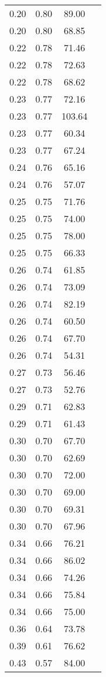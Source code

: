 \begin{longtable}[H]{ c c c c }
	 0.20 & 0.80 & 89.00 & \cite{Friak2012}\\
	 0.20 & 0.80 & 68.85 & \cite{Karre2015}\\
	 0.22 & 0.78 & 71.46 & \cite{Ozaki2004}\\
	 0.22 & 0.78 & 72.63 & \cite{Karre2015}\\
	 0.22 & 0.78 & 68.62 & \cite{Karre2015}\\
	 0.23 & 0.77 & 72.16 & \cite{Timoshevskii2011}\\
	 0.23 & 0.77 & 103.64 & \cite{Ozaki2004}\\
	 0.23 & 0.77 & 60.34 & \cite{Karre2015}\\
	 0.23 & 0.77 & 67.24 & \cite{Karre2015}\\
	 0.24 & 0.76 & 65.16 & \cite{Karre2015}\\
	 0.24 & 0.76 & 57.07 & \cite{Karre2015}\\
	 0.25 & 0.75 & 71.76 & \cite{Timoshevskii2011}\\
	 0.25 & 0.75 & 74.00 & \cite{Friak2012}\\
	 0.25 & 0.75 & 78.00 & \cite{Friak2012}\\
	 0.25 & 0.75 & 66.33 & \cite{Ozaki2004}\\
	 0.26 & 0.74 & 61.85 & \cite{Karre2015}\\
	 0.26 & 0.74 & 73.09 & \cite{Karre2015}\\
	 0.26 & 0.74 & 82.19 & \cite{Ozaki2004}\\
	 0.26 & 0.74 & 60.50 & \cite{Ozaki2004}\\
	 0.26 & 0.74 & 67.70 & \cite{Timoshevskii2011}\\
	 0.26 & 0.74 & 54.31 & \cite{Karre2015}\\
	 0.27 & 0.73 & 56.46 & \cite{Karre2015}\\
	 0.27 & 0.73 & 52.76 & \cite{Karre2015}\\
	 0.29 & 0.71 & 62.83 & \cite{Ozaki2004}\\
	 0.29 & 0.71 & 61.43 & \cite{Ozaki2004}\\
	 0.30 & 0.70 & 67.70 & \cite{Timoshevskii2011}\\
	 0.30 & 0.70 & 62.69 & \cite{Karre2015}\\
	 0.30 & 0.70 & 72.00 & \cite{Friak2012}\\
	 0.30 & 0.70 & 69.00 & \cite{Friak2012}\\
	 0.30 & 0.70 & 69.31 & \cite{Karre2015}\\
	 0.30 & 0.70 & 67.96 & \cite{Ozaki2004}\\
	 0.34 & 0.66 & 76.21 & \cite{Karre2015}\\
	 0.34 & 0.66 & 86.02 & \cite{Karre2015}\\
	 0.34 & 0.66 & 74.26 & \cite{Ozaki2004}\\
	 0.34 & 0.66 & 75.84 & \cite{Karre2015}\\
	 0.34 & 0.66 & 75.00 & \cite{Timoshevskii2011}\\
	 0.36 & 0.64 & 73.78 & \cite{Timoshevskii2011}\\
	 0.39 & 0.61 & 76.62 & \cite{Timoshevskii2011}\\
	 0.43 & 0.57 & 84.00 & \cite{Ozaki2004}\\
	\hline
\end{longtable}
